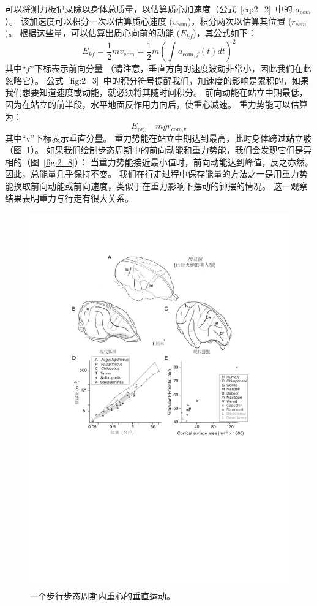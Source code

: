 可以将测力板记录除以身体总质量，以估算质心加速度（公式~\ref{eq:2_2}~中的 $a_{com}$）。
该加速度可以积分一次以估算质心速度 ($v_{\text{com}}$)，积分两次以估算其位置 ($r_{com}$)。
根据这些量，可以估算出质心向前的动能 ($E_{kf}$)，其公式如下：
\begin{equation}
	E_{kf} = \frac{1}{2} m v_{\text{com}}
		   = \frac{1}{2} m 
		   	 ( \int a_{\text{com},f} (t) dt )^2  \label{eq:2_3}
\end{equation}
%
其中“$f$”下标表示前向分量
（请注意，垂直方向的速度波动非常小，因此我们在此忽略它）。
公式~\ref{fig:2_3}~中的积分符号提醒我们，加速度的影响是累积的，如果我们想要知道速度或动能，就必须将其随时间积分。
前向动能在站立中期最低，因为在站立的前半段，水平地面反作用力向后，使重心减速。
重力势能可以估算为：
\begin{equation}
	E_{\text{pg}} 
		= m g r_{\text{com},\text{v}} \label{eq:2_4}
\end{equation}
%
其中“v”下标表示垂直分量。
重力势能在站立中期达到最高，此时身体跨过站立肢（图~\ref{fig:2_7}）。
如果我们绘制步态周期中的前向动能和重力势能，我们会发现它们是异相的（图~\ref{fig:2_8}）：
当重力势能接近最小值时，前向动能达到峰值，反之亦然。
因此，总能量几乎保持不变。
我们在行走过程中保存能量的方法之一是用重力势能换取前向动能或前向速度，类似于在重力影响下摆动的钟摆的情况。
这一观察结果表明重力与行走有很大关系。


\begin{figure}[!htb]
	\centering
	\includegraphics[width=0.5\linewidth]{chap2/2_7}
	\caption{一个步行步态周期内重心的垂直运动。 \label{fig:2_7}}
\end{figure}


